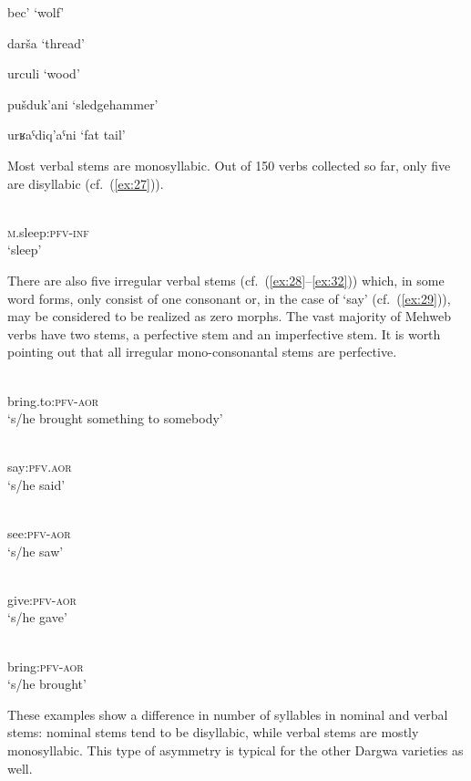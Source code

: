 \documentclass[output=paper]{langsci/langscibook}
\begin{document}
\ea \label{ex:22} %
{bec'}
\glt `wolf'

\ex \label{ex:23} %
{darša}
\glt `thread'

\ex \label{ex:24} %
{urculi}
\glt `wood'

\ex \label{ex:25} %
{pušduk'ani}
\glt`sledgehammer'

\ex \label{ex:26} %
{urʁaˤdiq'aˤni}
\glt `fat tail'
\z



Most verbal stems are monosyllabic. Out of 150 verbs collected so far,
only five are disyllabic (cf.\ (\ref{ex:27})).

\ea \label{ex:27} %
\\
\textsc{m}.sleep:\textsc{pfv}-\textsc{inf}\\
\glt `sleep'        
\z

There are also five
irregular verbal stems (cf.\ (\ref{ex:28}–\ref{ex:32})) which, in some word forms, only consist of
one consonant or, in the case of `say' (cf.\ (\ref{ex:29})), may be considered to be
realized as zero morphs. The vast majority of Mehweb verbs have two
stems, a perfective stem and an imperfective stem. It is worth pointing
out that all irregular mono-consonantal stems are perfective.

\ea \label{ex:28} %
\\
bring.to:\textsc{pfv}-\textsc{aor}\\
\glt `s/he brought something to somebody'

\ex \label{ex:29} %
\\
say:\textsc{pfv}.\textsc{aor}\\
\glt `s/he said'

\ex \label{ex:30} %
\\
see:\textsc{pfv}-\textsc{aor}\\
\glt `s/he saw'

\ex \label{ex:31} %
\\
give:\textsc{pfv}-\textsc{aor}\\
\glt `s/he gave'    

\ex \label{ex:32} %
\\
bring:\textsc{pfv}-\textsc{aor}\\
\glt `s/he brought'

\z


These examples show a difference in number of syllables in nominal and
verbal stems: nominal stems tend to be disyllabic, while verbal stems
are mostly monosyllabic. This type of asymmetry is typical for the other
Dargwa varieties as well.
\end{document}
